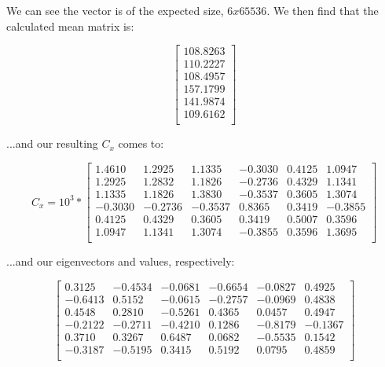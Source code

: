 \documentclass{article}
\begin{document}
\noindent We can see the vector is of the expected size, $6x65536$. We then find that the calculated mean matrix is:

\begin{equation}
    \begin{bmatrix}   
        108.8263 \\
        110.2227 \\
        108.4957 \\
        157.1799 \\
        141.9874 \\
        109.6162 \\
    \end{bmatrix}
\end{equation}

\noindent ...and our resulting $C_x$ comes to:

\begin{equation}
    C_x = 10^3 *
    \begin{bmatrix}
        1.4610 &    1.2925 &    1.1335 &   -0.3030 &    0.4125 &    1.0947 \\
        1.2925 &    1.2832 &    1.1826 &   -0.2736 &    0.4329 &    1.1341 \\
        1.1335 &    1.1826 &    1.3830 &   -0.3537 &    0.3605 &    1.3074 \\
        -0.3030 &   -0.2736 &   -0.3537 &    0.8365 &    0.3419 &   -0.3855 \\
        0.4125 &    0.4329 &    0.3605 &    0.3419 &    0.5007 &    0.3596 \\
        1.0947 &    1.1341 &    1.3074 &   -0.3855 &    0.3596 &    1.3695 \\
    \end{bmatrix}
\end{equation}

\noindent ...and our eigenvectors and values, respectively:

\begin{equation}
    \begin{bmatrix}
        0.3125 &   -0.4534 &   -0.0681 &   -0.6654 &   -0.0827 &    0.4925 \\
        -0.6413 &    0.5152 &   -0.0615 &   -0.2757 &   -0.0969 &    0.4838 \\
        0.4548 &    0.2810 &   -0.5261 &    0.4365 &    0.0457 &    0.4947 \\
        -0.2122 &   -0.2711 &   -0.4210 &    0.1286 &   -0.8179 &   -0.1367 \\
        0.3710 &    0.3267 &    0.6487 &    0.0682 &   -0.5535 &    0.1542 \\
        -0.3187 &   -0.5195 &    0.3415 &    0.5192 &    0.0795 &    0.4859 \\
    \end{bmatrix}
\end{equation}
\end{document}
